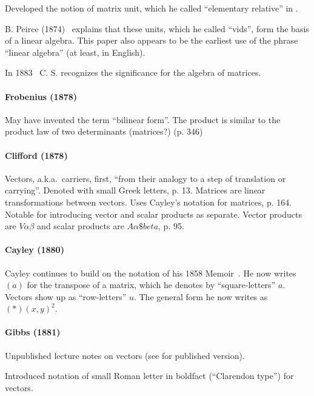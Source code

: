 Developed the notion of matrix unit, which he called ``elementary relative'' in \cite[p.359]{Peirce1873}.

B. Peirce (1874)~\cite{Peirce1874} explains that these units, which he called ``vids'', form the basis of a linear algebra.
This paper also appears to be the earliest use of the phrase ``linear algebra'' (at least, in English).

In 1883~\cite{Peirce1883} C. S. recognizes the significance for the algebra of matrices.

\paragraph{Frobenius (1878)~\cite{Frobenius1878}}

May have invented the term ``bilinear form''.
The product is similar to the product law of two determinants (matrices?) (p. 346)


\paragraph{Clifford (1878)~\cite{Clifford1878}}

Vectors, a.k.a.\ carriers, first, ``from their analogy to a step of translation or carrying''.
Denoted with small Greek letters, p. 13.
Matrices are linear transformations between vectors. Uses Cayley's notation for matrices, p. 164.
Notable for introducing vector and scalar products as separate.
Vector products are $V\alpha\beta$ and scalar products are $A\alpha\$beta$, p. 95.



\paragraph{Cayley (1880)~\cite{Cayley1880}}

Cayley continues to build on the notation of his 1858 Memoir~\cite{Cayley1858}.
He now writes $(a)$ for the transpose of a matrix, which he denotes by
``square-letters'' $a$. Vectors show up as ``row-letters'' $u$.
The general form he now writes as $(*)(x, y)^2$.

\paragraph{Gibbs (1881)~\cite{Gibbs1881}}

Unpublished lecture notes on vectors (see \cite{Wilson1901} for published version).

Introduced notation of small Roman letter in boldfact (``Clarendon type'') for vectors.

